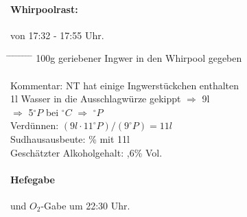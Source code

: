 \documentclass[12pt,oneside,a4paper]{scrartcl}
\begin{document}
{\paragraph{Whirpoolrast:} von 17:32 - 17:55 Uhr.
	\begin{tabbing}
		\hspace{1cm} \= \hspace{1cm} \= \hspace{1cm} \= \hspace{1cm} \= \hspace{1cm} \= \hspace{1cm} \= \hspace{1cm} \= \hspace{1cm} \= \kill
		\> 100g geriebener Ingwer in den Whirpool gegeben\\\\
		\> Kommentar: \> \> \> NT hat einige Ingwerstückchen enthalten\\
		\> \> \> \> 1l Wasser in die Ausschlagwürze gekippt $\Rightarrow$ 9l\\
		\> \> $\Rightarrow$ 5$^\circ P$ \> \> bei $^\circ C$ \> $\Rightarrow$ $^\circ P$\\
		\> \> Verdünnen: \> \> \> \> \> $(9l \cdot 11^\circ P)/(9^\circ P)=11l$\\
		\> \> Sudhausausbeute: \> \> \> \>  \% mit 11l\\
		\> \> Geschätzter Alkoholgehalt: \> \> \> \> ,6\% Vol.
	\end{tabbing}
%
\paragraph{Hefegabe} und $O_2$-Gabe um 22:30 Uhr.
}
\end{document}
